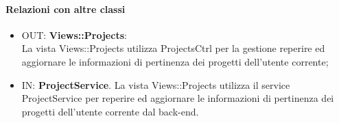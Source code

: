 	\paragraph{Relazioni con altre classi}
	\begin{itemize}
	  \item OUT: \textbf{Views::Projects}:\\
		La vista Views::Projects utilizza ProjectsCtrl per la gestione reperire ed aggiornare le informazioni di pertinenza dei progetti dell'utente corrente;	
	  \item IN: \textbf{ProjectService}.
		La vista Views::Projects utilizza il service ProjectService per reperire ed aggiornare le informazioni di pertinenza dei progetti dell'utente corrente dal back-end.
	\end{itemize}
	
	
		




































